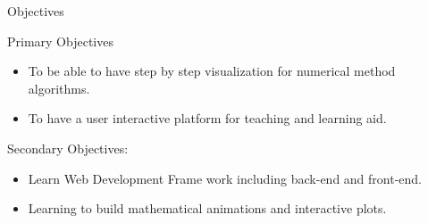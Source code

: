 \begin{frame}{Objectives}
\begin{block}{Primary Objectives}
\begin{itemize}
    \item To be able to have step by step visualization for numerical method algorithms.
    \item To have a user interactive platform for teaching and learning aid.
\end{itemize}
\end{block}
\begin{block}{Secondary Objectives:}
\begin{itemize}
    \item Learn Web Development Frame work including back-end and front-end.
    \item Learning to build mathematical animations and interactive plots.
\end{itemize}
\end{block}
\end{frame}
